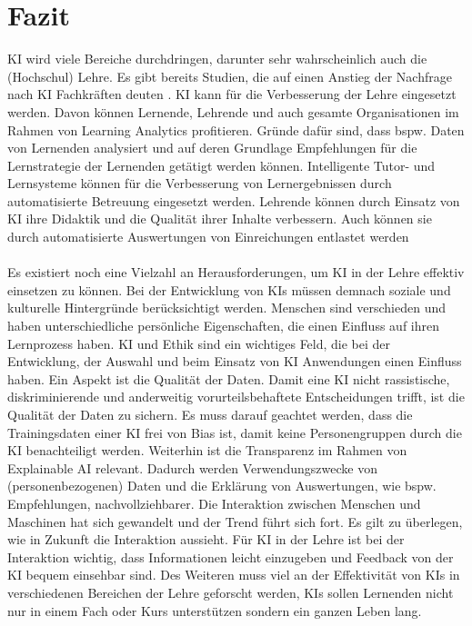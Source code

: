 \chapter{Fazit}
KI wird viele Bereiche durchdringen, darunter sehr wahrscheinlich auch die (Hochschul) Lehre.
Es gibt bereits Studien, die auf einen Anstieg der Nachfrage nach KI Fachkräften deuten \cite[S. 26]{Witt.2020}.
KI kann für die Verbesserung der Lehre eingesetzt werden. Davon können Lernende, Lehrende und auch gesamte Organisationen im Rahmen von Learning Analytics profitieren.
Gründe dafür sind, dass bspw. Daten von Lernenden analysiert und auf deren Grundlage Empfehlungen für die Lernstrategie der Lernenden getätigt werden können. %
Intelligente Tutor- und Lernsysteme können für die Verbesserung von Lernergebnissen durch automatisierte Betreuung eingesetzt werden. %
Lehrende können durch Einsatz von KI ihre Didaktik und die Qualität ihrer Inhalte verbessern.
Auch können sie durch automatisierte Auswertungen von Einreichungen entlastet werden \cite[S. 14ff]{Witt.2020}
\\
\\ \noindent
Es existiert noch eine Vielzahl an Herausforderungen, um KI in der Lehre effektiv einsetzen zu können.
Bei der Entwicklung von KIs müssen demnach soziale und kulturelle Hintergründe berücksichtigt werden.
Menschen sind verschieden und haben unterschiedliche persönliche Eigenschaften, die einen Einfluss auf ihren Lernprozess haben. \cite[S. 9ff]{Witt.2020}
KI und Ethik sind ein wichtiges Feld, die bei der Entwicklung, der Auswahl und beim Einsatz von KI Anwendungen einen Einfluss haben.
Ein Aspekt ist die Qualität der Daten. Damit eine KI nicht rassistische, diskriminierende und anderweitig vorurteilsbehaftete Entscheidungen trifft, ist die Qualität der Daten zu sichern.
Es muss darauf geachtet werden, dass die Trainingsdaten einer KI frei von Bias ist, damit keine Personengruppen durch die KI benachteiligt werden. \cite[S. 39]{Witt.2020} 
Weiterhin ist die Transparenz im Rahmen von Explainable AI relevant. Dadurch werden Verwendungszwecke von (personenbezogenen) Daten und die Erklärung von Auswertungen, wie bspw. Empfehlungen, nachvollziehbarer. %
Die Interaktion zwischen Menschen und Maschinen hat sich gewandelt und der Trend führt sich fort. Es gilt zu überlegen, wie in Zukunft die Interaktion aussieht.
Für KI in der Lehre ist bei der Interaktion wichtig, dass Informationen leicht einzugeben und Feedback von der KI bequem einsehbar sind. 
Des Weiteren muss viel an der Effektivität von KIs in verschiedenen Bereichen der Lehre geforscht werden, KIs sollen Lernenden nicht nur in einem Fach oder Kurs unterstützen sondern ein ganzen Leben lang.
